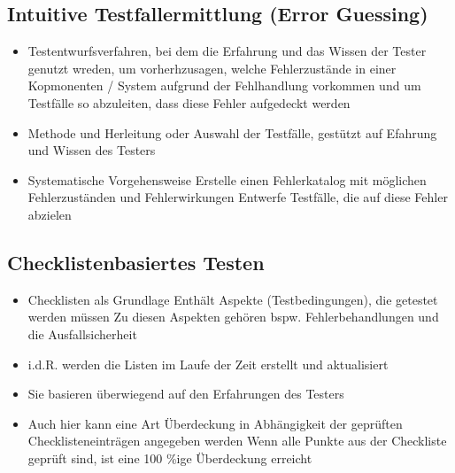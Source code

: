 \documentclass{report}
\theoremstyle{definition}
\theoremstyle{example}
\begin{document}
\subsection{Intuitive Testfallermittlung (Error Guessing)}
\begin{itemize}
   \item Testentwurfsverfahren, bei dem die Erfahrung und das Wissen der Tester genutzt wreden, um vorherhzusagen, welche Fehlerzustände in einer Kopmonenten / System aufgrund der Fehlhandlung vorkommen und um Testfälle so abzuleiten, dass diese Fehler aufgedeckt werden
   \item Methode und Herleitung oder Auswahl der Testfälle, gestützt auf Efahrung und Wissen des Testers
   \item Systematische Vorgehensweise
   \subitem Erstelle einen Fehlerkatalog mit möglichen Fehlerzuständen und Fehlerwirkungen
   \subitem Entwerfe Testfälle, die auf diese Fehler abzielen 
\end{itemize}

\subsection{Checklistenbasiertes Testen}
\begin{itemize}
   \item Checklisten als Grundlage
   \subitem Enthält Aspekte (Testbedingungen), die getestet werden müssen
   \subitem Zu diesen Aspekten gehören bspw. Fehlerbehandlungen und die Ausfallsicherheit
   \item i.d.R. werden die Listen im Laufe der Zeit erstellt und aktualisiert
   \item Sie basieren überwiegend auf den Erfahrungen des Testers
   \item Auch hier kann eine Art Überdeckung in Abhängigkeit der geprüften Checklisteneinträgen angegeben werden
   \subitem Wenn alle Punkte aus der Checkliste geprüft sind, ist eine 100 \%ige Überdeckung erreicht
\end{itemize}
\end{document}
